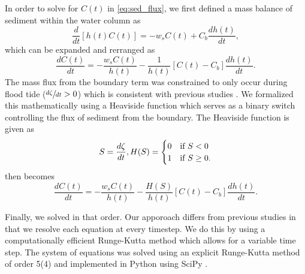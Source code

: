 In order to solve for $C(t)$ in \cref{eq:sed_flux}, we first defined a mass balance of sediment within the water column as
\begin{equation}\label{eq:conc_mass_bal}
	\frac{d}{dt}[h(t)C(t)] = -w_s C(t) + C_b \frac{dh(t)}{dt},
\end{equation}
which can be expanded and rerranged as
\begin{equation}\label{eq:conc_dt}
	\frac{dC(t)}{dt} = - \frac{w_sC(t)}{h(t)} - \frac{1}{h(t)}[C(t) - C_b]\frac{dh(t)}{dt}.
\end{equation}
The mass flux from the boundary term was constrained to only occur during flood tide ($\sfrac{d\zeta}{dt} > 0$) which is consistent with previous studies \citep{kroneMethodSimulatingMarsh1987, allenSaltmarshGrowthStratification1990, frenchNumericalSimulationVertical1993, temmermanModellingLongtermTidal2003, temmermanModellingEstuarineVariations2004}. We formalized this mathematically using a Heaviside function which serves as a binary switch controlling the flux of sediment from the boundary. The Heaviside function is given as
\begin{equation}\label{eq:heaviside}
	S = \frac{d\zeta}{dt},\\
	H(S) =
	\begin{cases}
		0 & \text{if $S < 0$}\\
		1 & \text{if $S \geq 0$}.
	\end{cases}
\end{equation}
 then becomes
\begin{equation}\label{eq:conc_sol}
	\frac{dC(t)}{dt} = - \frac{w_s C(t)}{h(t)} - \frac{H(S)}{h(t)} [C(t) - C_b]\frac{dh(t)}{dt}.
\end{equation}

Finally, we solved  in that order. Our apporoach differs from previous studies in that we resolve each equation at every timestep. We do this by using a computationally efficient Runge-Kutta method which allows for a variable time step. The system of equations was solved using an explicit Runge-Kutta method of order 5(4) \citep{dormandFamilyEmbeddedRungeKutta1980} and implemented in Python using SciPy \citep{virtanenSciPyFundamentalAlgorithms2020}. 


